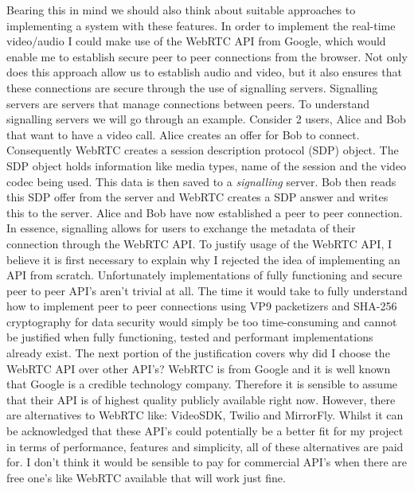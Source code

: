 Bearing this in mind we should also think about suitable 
approaches to implementing a system with these features. In 
order to implement the real-time video/audio I could make use
of the WebRTC API from Google, which would enable me to 
establish secure peer to peer connections from the browser. 
Not only does this approach allow us to establish audio and 
video, but it also ensures that these connections are secure 
through the use of signalling servers. Signalling servers are
servers that manage connections between peers. To understand 
signalling servers we will go through an example. Consider 2 
users, Alice and Bob that want to have a video call. Alice 
creates an offer for Bob to connect. Consequently WebRTC 
creates a session description protocol (SDP) object. The SDP 
object holds information like media types, name of the
session and the video codec being used. This data is then 
saved to a \textit{signalling} server. Bob then reads this SDP
offer from the server and WebRTC creates a SDP answer and
writes this to the server. Alice and Bob have now established 
a peer to peer connection. In essence, signalling allows for 
users to exchange the metadata of their connection through the
WebRTC API. To justify usage of the WebRTC API, I believe it 
is first necessary to explain why I rejected the idea of
implementing an API from scratch. Unfortunately
implementations of fully functioning and secure peer to peer
API's aren't trivial at all. The time it would take to fully
understand how to implement peer to peer connections using 
VP9 packetizers \cite{vp9} and SHA-256 cryptography for data
security would simply be too time-consuming and cannot be
justified when fully functioning, tested and performant 
implementations already exist. The next 
portion of the justification covers why did I choose the
WebRTC API over other API's? WebRTC is from Google and it is 
well known that Google is a credible technology company. 
Therefore it is sensible to assume that their API is of 
highest quality publicly available right now. However, there
are alternatives to WebRTC like: VideoSDK, Twilio and 
MirrorFly. Whilst it can be acknowledged that these API's could
potentially be a better fit for my project in terms of
performance, features and simplicity, all of these alternatives
are paid for. I don't think it would be sensible to pay for
commercial API's when there are free one's like WebRTC
available that will work just fine.

\vspace{0.2cm}

